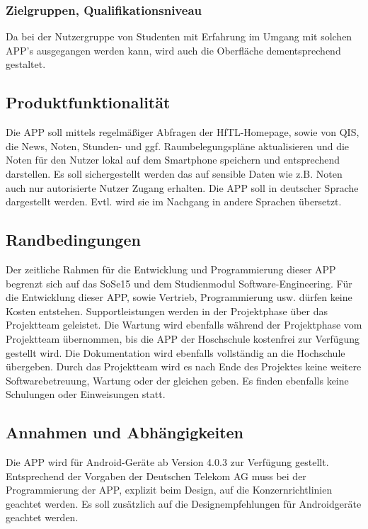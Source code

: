\subsubsection{Zielgruppen, Qualifikationsniveau}

Da bei der Nutzergruppe von Studenten mit Erfahrung im Umgang mit solchen APP's ausgegangen werden kann, wird auch die Oberfläche dementsprechend gestaltet.

\subsection{\textbf{Produktfunktionalität}}

Die APP soll mittels regelmäßiger Abfragen der \acs{HfTL}-Homepage, sowie von \acs{QIS}, die News, Noten, Stunden- und ggf. Raumbelegungspläne aktualisieren und die Noten für den Nutzer lokal auf dem Smartphone speichern und entsprechend darstellen. 
Es soll sichergestellt werden das auf sensible Daten wie z.B. Noten auch nur autorisierte Nutzer Zugang erhalten. Die APP soll in deutscher Sprache dargestellt werden. Evtl. wird sie im Nachgang in andere Sprachen übersetzt. 

\subsection{\textbf{Randbedingungen}}

Der zeitliche Rahmen für die Entwicklung und Programmierung dieser APP begrenzt sich auf das \ac{SoSe15} und dem Studienmodul Software-Engineering.
Für die Entwicklung dieser APP, sowie Vertrieb, Programmierung usw. dürfen keine Kosten entstehen.
Supportleistungen werden in der Projektphase über das Projektteam geleistet. Die Wartung wird ebenfalls während der Projektphase vom Projektteam übernommen, bis die APP der Hoschschule  kostenfrei zur Verfügung gestellt wird. Die Dokumentation wird ebenfalls vollständig an die Hochschule übergeben.
Durch das Projektteam wird es nach Ende des Projektes keine weitere Softwarebetreuung, Wartung oder der gleichen geben. Es finden ebenfalls keine Schulungen oder Einweisungen statt.

\subsection{\textbf{Annahmen und Abhängigkeiten}}

Die APP wird für Android-Geräte ab Version 4.0.3 zur Verfügung gestellt.
Entsprechend der Vorgaben der Deutschen Telekom AG muss bei der Programmierung der APP, explizit beim Design, auf die Konzernrichtlinien geachtet werden. Es soll zusätzlich auf die Designempfehlungen für Androidgeräte geachtet werden.

